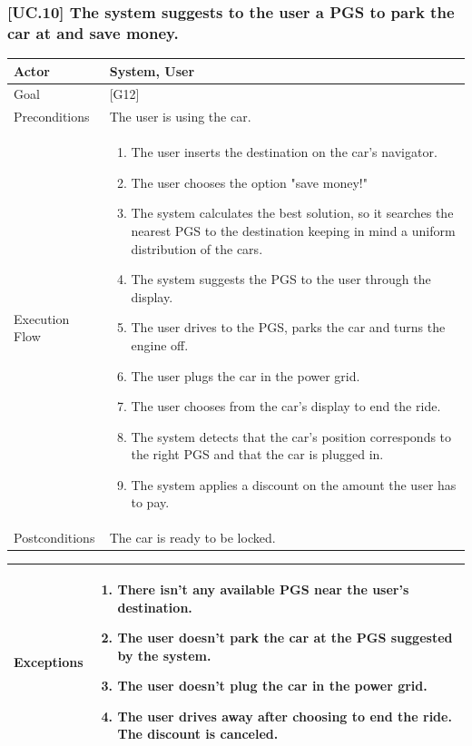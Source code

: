 \documentclass[english]{article}
\begin{document}
		\subsubsection{[UC.10] The system suggests to the user a PGS to park the car at and save money.}
			\begin{tabularx}{\textwidth}{  l  X  }
				\hline
				Actor & System, User\\
				\hline
				Goal & [G12]\\
				\hline
				Preconditions & The user is using the car.\\
				\hline
				Execution Flow & \begin{enumerate}
					\item{The user inserts the destination on the car's navigator.}
					\item{The user chooses the option "save money!"}
					\item{The system calculates the best solution, so it searches the nearest PGS to the destination keeping in mind a uniform distribution of the cars.}
					\item{The system suggests the PGS to the user through the display.}
					\item{The user drives to the PGS, parks the car and turns the engine off.}
					\item{The user plugs the car in the power grid.}
					\item{The user chooses from the car's display to end the ride.}
					\item{The system detects that the car's position corresponds to the right PGS and that the car is plugged in.}
					\item{The system applies a discount on the amount the user has to pay.}
				\end{enumerate}\\
				\hline
				Postconditions & The car is ready to be locked.\\
				\hline
			\end{tabularx}
			\begin{tabularx}{\textwidth}{ l X }
				Exceptions & \begin{enumerate}
					\item{There isn't any available PGS near the user's destination.}
					\item{The user doesn't park the car at the PGS suggested by the system.}
					\item{The user doesn't plug the car in the power grid.}
					\item{The user drives away after choosing to end the ride. The discount is canceled.}
				\end{enumerate}\\
				\hline
			\end{tabularx}
\end{document}
